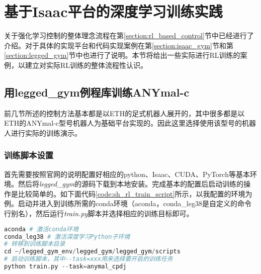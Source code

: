 
\chapter[基于Isaac平台的深度学习训练实践]{基于Isaac平台的深度学习训练实践}
关于强化学习控制的整体理念流程在第\ref{section:rl_based_control}节中已经进行了介绍。对于具体的实现平台和代码实现案例在第\ref{section:isaac_gym}节和第\ref{section:legged_gym}节中也进行了说明。本节将给出一些实际进行RL训练的案例，以建立对实际RL训练的整体流程性认识。

\section[用legged\_gym例程库训练ANYmal-c]{用legged\_gym例程库训练ANYmal-c}
前几节所述的控制方法基本都是以ETH的足式机器人展开的，其中很多都是以ETH的ANYmal-c型号机器人为基础平台实现的。因此这里选择使用该型号的机器人进行实际的训练演示。
\subsection[训练脚本设置]{训练脚本设置}
首先需要按照官网的说明配置好相应的python、Isaac、CUDA、PyTorch等基本环境。然后将\emph{legged\_gym}的源码下载到本地安装。完成基本的配置后启动训练的操作是比较简单的。如下面代码\ref{code:sh_rl_train_script}所示，以我配置的环境为例。启动并进入到训练所需的conda环境（aconda，conda\_leg38是自定义的命令行别名），然后运行\emph{train.py}脚本并选择相应的训练目标即可。
\noindent
\begin{minipage}{\linewidth}
\begin{lstlisting}[language=python,caption={自定义的RL训练.sh快捷启动脚本},xleftmargin=20pt,label={code:sh_rl_train_script}]
aconda # 激活conda环境
conda_leg38 # 激活深度学习Python子环境 
# 转移到训练脚本目录
cd ~/legged_gym_env/legged_gym/legged_gym/scripts 
# 启动训练脚本，其中--task=xxx用来选择要开启的训练任务
python train.py --task=anymal_cpdj 
\end{lstlisting}
\end{minipage}

